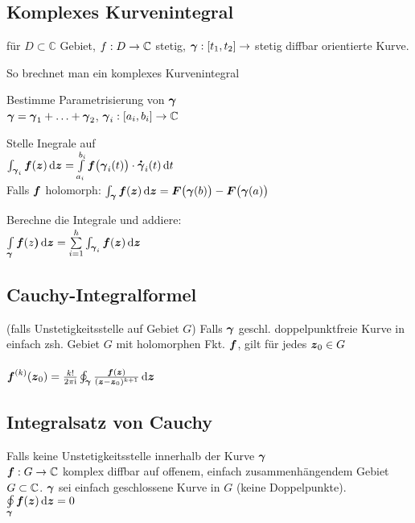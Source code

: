 \documentclass[german,color]{latex4ei/latex4ei_fs}
\begin{document}
\begin{sectionbox}
	\subsection{Komplexes Kurvenintegral}
	für $D \subset \mathbb C$ Gebiet, $f: D \rightarrow \mathbb C$ stetig, $\boldsymbol{\gamma}: [t_1, t_2] \rightarrow $ stetig diffbar orientierte Kurve. \\ 
	\begin{cookbox}{So brechnet man ein komplexes Kurvenintegral}
		\item Bestimme Parametrisierung von $\boldsymbol{\gamma}$ \\
		$\boldsymbol{\gamma} = \boldsymbol{\gamma}_1 + \ldots + \boldsymbol{\gamma}_2$, $\boldsymbol{\gamma}_i : [a_i, b_i] \rightarrow \mathbb C$
		\item Stelle Inegrale auf \\
		$\int_{\cx \gamma_i} \cx f(\cx z) \diff \cx z = \int \limits_{a_i}^{b_i} \cx f\big(\cx \gamma_i(t)\big) \cdot \dot{\cx \gamma}_i (t) \diff t$\\
		Falls $\boldsymbol{f}$ holomorph: $\int_{\cx \gamma} \cx f(\cx z) \diff \cx z = \cx F\big(\cx \gamma(b)\big) - \cx F\big(\cx \gamma(a)\big)$
		\item Berechne die Integrale und addiere: \\
		$\int \limits_{\cx \gamma} \cx f(z\cx ) \diff \cx z = \sum \limits_{i = 1}^{h} \int_{\cx \gamma_i} \cx f(\cx z) \diff \cx z$
	\end{cookbox}
\end{sectionbox}

\begin{sectionbox}
	\subsection{Cauchy-Integralformel}
	(falls Unstetigkeitsstelle auf Gebiet $G$)
	Falls $\boldsymbol{\gamma}$ geschl. doppelpunktfreie Kurve in einfach zsh. Gebiet $G$ mit holomorphen Fkt. $\boldsymbol{f}$, gilt für jedes $\boldsymbol{z}_0 \in G$\\
	\\
	$\cx f^{(k)}(\cx z_0) = \frac{k!}{2\pi \i} \oint_{\cx \gamma} \frac{\cx f(\cx z)}{(\cx z - \cx z_0)^{k+1}} \diff \cx z$ 
	
	\subsection{Integralsatz von Cauchy}
	Falls keine Unstetigkeitsstelle innerhalb der Kurve $\boldsymbol{\gamma}$\\ 
	$\boldsymbol{f}: G \rightarrow \mathbb C$ komplex diffbar auf offenem, einfach zusammenhängendem Gebiet $G \subset \mathbb C$. $\boldsymbol{\gamma}$ sei einfach geschlossene Kurve in $G$ (keine Doppelpunkte). \\
	$\oint \limits_{\cx \gamma} \cx f(\cx z) \diff \cx z = 0$
\end{sectionbox}
\end{document}
